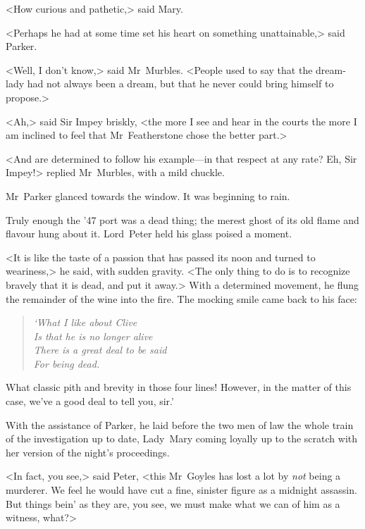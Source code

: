 <How curious and pathetic,> said Mary.

<Perhaps he had at some time set his heart on something unattainable,> said Parker.

<Well, I don't know,> said Mr~Murbles. <People used to say that the dream-lady had not always been a dream, but that he never could bring himself to propose.>

<Ah,> said Sir Impey briskly, <the more I see and hear in the courts the more I am inclined to feel that Mr~Featherstone chose the better part.>

<And are determined to follow his example—in that respect at any rate?  Eh, Sir Impey!> replied Mr~Murbles, with a mild chuckle.

Mr~Parker glanced towards the window. It was beginning to rain.

Truly enough the '47 port was a dead thing; the merest ghost of its old flame and flavour hung about it. Lord~Peter held his glass poised a moment.

<It is like the taste of a passion that has passed its noon and turned to weariness,> he said, with sudden gravity. <The only thing to do is to recognize bravely that it is dead, and put it away.> With a determined movement, he flung the remainder of the wine into the fire.  The mocking smile came back to his face: 
\begin{quote}\itshape
`What I like about Clive\\
Is that he is no longer alive\longdash \\
There is a great deal to be said\\
For being dead.\\
\end{quote}
\vspace{-4ex}
What classic pith and brevity in those four lines! However, in the matter of this case, we've a good deal to tell you, sir.'

With the assistance of Parker, he laid before the two men of law the whole train of the investigation up to date, Lady~Mary coming loyally up to the scratch with her version of the night's proceedings.

<In fact, you see,> said Peter, <this Mr~Goyles has lost a lot by \textit{not} being a murderer. We feel he would have cut a fine, sinister figure as a midnight assassin. But things bein' as they are, you see, we must make what we can of him as a witness, what?>

